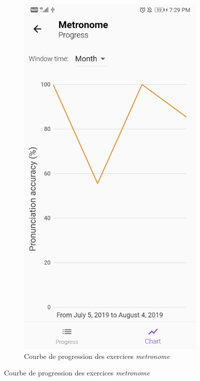 \begin{appendices}
\begin{landscape}
\begin{figure}[h]
\begin{subfigure}{.25\textwidth}
    \includegraphics[width=.75\linewidth]{content/imgs/screen8.jpg}
    \caption{Courbe de progression des exercices \textit{metronome}}
    \label{appendix:screen_progress3}
  \end{subfigure}
\end{figure}



\end{landscape}
\end{appendices}
